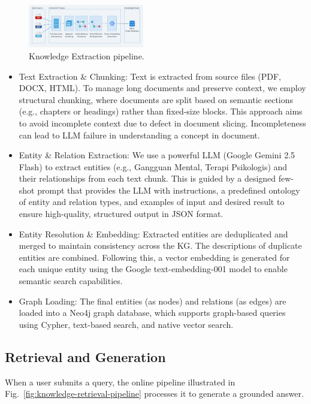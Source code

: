 \documentclass[conference]{IEEEtran}
\begin{document}
\begin{figure}[htbp]
    \centerline{\includegraphics[width=0.45\textwidth]{knowledge-extraction-flow.png}}
    \caption{Knowledge Extraction pipeline.}
    \label{fig:knowledge-extraction-pipeline}
\end{figure}

\begin{itemize}
    \item Text Extraction \& Chunking: Text is extracted from source files (PDF, DOCX, HTML).
          To manage long documents and preserve context, we employ structural chunking, where documents are split based on semantic sections (e.g., chapters or headings) rather than fixed-size blocks.
          This approach aims to avoid incomplete context due to defect in document slicing.
          Incompleteness can lead to LLM failure in understanding a concept in document.

    \item Entity \& Relation Extraction: We use a powerful LLM (Google Gemini 2.5 Flash) to extract entities (e.g., Gangguan Mental, Terapi Psikologis) and their relationships from each text chunk.
          This is guided by a designed few-shot prompt that provides the LLM with instructions, a predefined ontology of entity and relation types, and examples of input and desired result to ensure high-quality, structured output in JSON format.

    \item Entity Resolution \& Embedding: Extracted entities are deduplicated and merged to maintain consistency across the KG.
          The descriptions of duplicate entities are combined. Following this, a vector embedding is generated for each unique entity using the Google text-embedding-001 model to enable semantic search capabilities.

    \item Graph Loading: The final entities (as nodes) and relations (as edges) are loaded into a Neo4j graph database, which supports graph-based queries using Cypher, text-based search, and native vector search.

\end{itemize}

\subsection{Retrieval and Generation}
When a user submits a query, the online pipeline illustrated in Fig.~\ref{fig:knowledge-retrieval-pipeline} processes it to generate a grounded answer.
\end{document}
